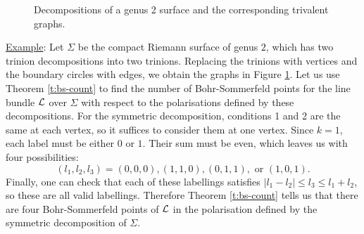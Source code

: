 	\begin{figure}[h]
		\centering
		\hspace{0.1\linewidth}
		\caption{Decompositions of a genus 2 surface and the corresponding trivalent graphs.}
		\label{fig:g2-graphs}
	\end{figure}

	\underline{Example}:
	Let $\Sigma$ be the compact Riemann surface of genus $2$, which has two trinion decompositions into two trinions. Replacing the trinions with vertices and the boundary circles with edges, we obtain the graphs in Figure \ref{fig:g2-graphs}. Let us use Theorem \ref{t:bs-count} to find the number of Bohr-Sommerfeld points for the line bundle $\mathcal{L}$ over $\Sigma$ with respect to the polarisations defined by these decompositions. For the symmetric decomposition, conditions 1 and 2 are the same at each vertex, so it suffices to consider them at one vertex. Since $k=1$, each label must be either $0$ or $1$. Their sum must be even, which leaves us with four possibilities:
	\begin{equation}
		(l_1, l_2, l_3) = (0,0,0), (1,1,0), (0,1,1), \text{ or } (1,0,1).
	\end{equation}
	Finally, one can check that each of these labellings satisfies $|l_1-l_2| \leq l_3 \leq l_1+l_2$, so these are all valid labellings. Therefore Theorem \ref{t:bs-count} tells us that there are four Bohr-Sommerfeld points of $\mathcal{L}$ in the polarisation defined by the symmetric decomposition of $\Sigma$.
	
